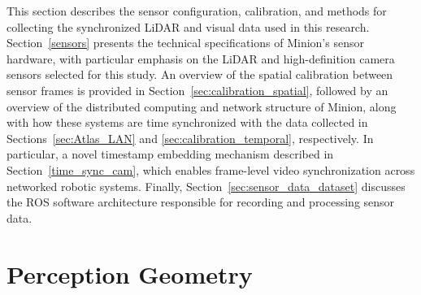 \documentclass{erauthesis}
\begin{document}
This section describes the sensor configuration, calibration, and methods for collecting the synchronized \ac{LiDAR} and visual data used in this research.
Section~\ref{sensors} presents the technical specifications of Minion's sensor hardware, with particular emphasis on the \ac{LiDAR} and high-definition camera sensors selected for this study.
An overview of the spatial calibration between sensor frames is provided in Section~\ref{sec:calibration_spatial}, followed by an overview of the distributed computing and network structure of Minion, along with how these systems are time synchronized with the data collected in Sections~\ref{sec:Atlas_LAN} and \ref{sec:calibration_temporal}, respectively. 
In particular, a novel timestamp embedding mechanism described in Section~\ref{time_sync_cam}, which enables frame-level video synchronization across networked robotic systems.
Finally, Section~\ref{sec:sensor_data_dataset} discusses the \ac{ROS} software architecture responsible for recording and processing sensor data.



\section{Perception Geometry} \label{perception_geometry}

\end{document}
